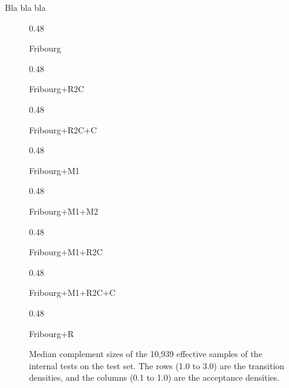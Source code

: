 Bla bla bla

\renewcommand{\arraystretch}{1.4}
\renewcommand{\subwidth}{0.48}


\begin{figure}
  \centering
  \begin{scriptsize}
  \renewcommand{\tabcolsep}{0.05cm}
  \begin{subtable}[t]{\subwidth\textwidth}
    \centering
    
    \caption{Fribourg}
  \end{subtable}
  \hfill
  \begin{subtable}[t]{\subwidth\textwidth}
    \centering
    
    \caption{Fribourg+R2C}
  \end{subtable}

  \renewcommand{\tabcolsep}{0.05cm}
  \begin{subtable}[t]{\subwidth\textwidth}
    \centering
    
    \caption{Fribourg+R2C+C}
  \end{subtable}
  \hfill
  \begin{subtable}[t]{\subwidth\textwidth}
    \centering
    
    \caption{Fribourg+M1}
  \end{subtable}

  \renewcommand{\tabcolsep}{0.05cm}
  \begin{subtable}[t]{\subwidth\textwidth}
    \centering
    
    \caption{Fribourg+M1+M2}
  \end{subtable}
  \hfill
  \begin{subtable}[t]{\subwidth\textwidth}
    \centering
    
    \caption{Fribourg+M1+R2C}
  \end{subtable}

  \renewcommand{\tabcolsep}{0.05cm}
  \begin{subtable}[t]{\subwidth\textwidth}
    \centering
    
    \caption{Fribourg+M1+R2C+C}
  \end{subtable}
  \hfill
  \begin{subtable}[t]{\subwidth\textwidth}
    \centering
    
    \caption{Fribourg+R}
  \end{subtable}
\end{scriptsize}
\caption{Median complement sizes of the 10,939 effective samples of the internal tests on the \goal{} test set. The rows (1.0 to 3.0) are the transition densities, and the columns (0.1 to 1.0) are the acceptance densities.}
\label{app_matrices}
\end{figure}


